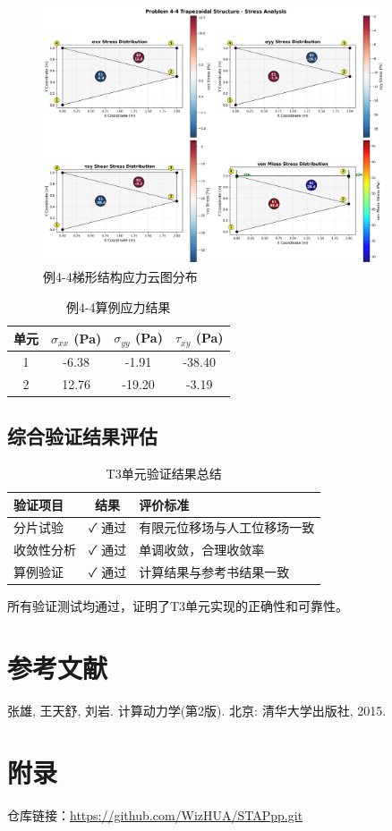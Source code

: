 \documentclass[12pt,a4paper]{article}
\begin{document}
\begin{figure}[H]
\centering
\includegraphics[width=0.9\textwidth]{img/wzy_stress_analysis.png}
\caption{例4-4梯形结构应力云图分布}
\label{fig:wzy_stress}
\end{figure}

\begin{table}[H]
\centering
\caption{例4-4算例应力结果}
\begin{tabular}{cccc}
\toprule
单元 & $\sigma_{xx}$ (Pa) & $\sigma_{yy}$ (Pa) & $\tau_{xy}$ (Pa) \\
\midrule
1 & -6.38 & -1.91 & -38.40 \\
2 & 12.76 & -19.20 & -3.19 \\
\bottomrule
\end{tabular}
\end{table}

\subsection{综合验证结果评估}

\begin{table}[H]
\centering
\caption{T3单元验证结果总结}
\begin{tabular}{lcl}
\toprule
验证项目 & 结果 & 评价标准 \\
\midrule
分片试验 & ✓ 通过 & 有限元位移场与人工位移场一致 \\
收敛性分析 & ✓ 通过 & 单调收敛，合理收敛率 \\
算例验证 & ✓ 通过 & 计算结果与参考书结果一致 \\
\bottomrule
\end{tabular}
\end{table}

所有验证测试均通过，证明了T3单元实现的正确性和可靠性。


\section{参考文献}

\begin{thebibliography}{99}
 张雄, 王天舒, 刘岩. 计算动力学(第2版). 北京: 清华大学出版社, 2015.
\end{thebibliography}

\section{附录}

仓库链接：\url{https://github.com/WizHUA/STAPpp.git}
\end{document}
